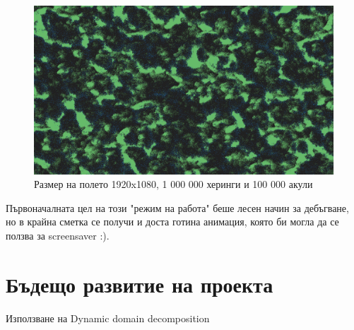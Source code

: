 \documentclass{article}
\begin{document}
\begin{figure}[H]
	\centering
	\includegraphics[width=1\textwidth]{screenshot-big.png}
	\caption{Размер на полето 1920x1080, 1 000 000 херинги и 100 000 акули}
\end{figure}

Първоначалната цел на този "режим на работа" беше лесен начин за дебъгване,
но в крайна сметка се получи и доста готина анимация, която би могла да се ползва за screensaver :).

\section{Бъдещо развитие на проекта}
Използване на Dynamic domain decomposition

{}

\end{document}
